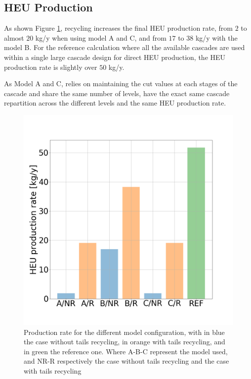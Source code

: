\subsection{\gls{HEU} Production}

As shown Figure \ref{fig:HEU_rate}, recycling increases the final \gls{HEU}
production rate, from $2$ to almost $20$ kg/y when using model A and C, and from
$17$ to $38$ kg/y with the model B. For the reference calculation where all the
available cascades are used within a single large cascade design for direct
\gls{HEU} production, the \gls{HEU} production rate is slightly over $50$ kg/y.


As Model A and C, relies on maintaining the cut values at each stages of the
cascade and share the same number of levels, have the exact same cascade
repartition across the different levels and the same \gls{HEU} production rate.

\begin{figure}[h!] %
    \centering
    \includegraphics[scale=0.25]{HEU_prod_rate}
    \caption{Production rate for the different model configuration, with in blue
    the case without tails recycling, in orange with tails recycling, and in green
    the reference one. Where A-B-C represent the model used, and NR-R
    respectively the case without tails recycling and the case with tails recycling}
    \label{fig:HEU_rate}
\end{figure}
